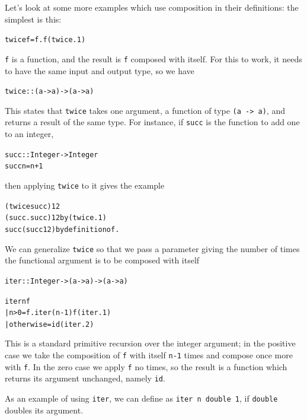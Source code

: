 Let's look at some more examples which use composition in their definitions: the 
simplest is this: 
\begin{alltt}
twice f = f.f\hfill (twice.1)
\end{alltt}
\texttt{f} is a function, and the result is \texttt{f} composed with itself. For
this to work, it needs to have the same input and output type, so we have
\begin{alltt}
twice :: (a -> a) -> (a -> a)
\end{alltt}
This states that \texttt{twice} takes one argument, a function of type 
\texttt{(a -> a)}, and returns a result of the same type. For instance, if \texttt{succ}
is the function to add one to an integer, 
\begin{alltt}
succ :: Integer -> Integer
succ n = n+1
\end{alltt}
then applying \texttt{twice} to it gives the example
\begin{alltt}
(twice succ) 12
\step (succ.succ) 12 \hfill {\rm by} (twice.1)
\step succ (succ 12) \hfill {\rm by definition of } .
\end{alltt}
We can generalize \texttt{twice} so that we pass a parameter giving the number
of times the functional argument is to be composed with itself
\begin{alltt}
iter :: Integer -> (a -> a) -> (a -> a)

iter n f 
  | n>0         = f . iter (n-1) f\hfill(iter.1)
  | otherwise   = id\hfill(iter.2)
\end{alltt}
This is a standard primitive recursion over the integer argument; in the
positive case we take the composition of \texttt{f} with itself
\texttt{n-1} times and compose once more with \texttt{f}. In the zero case
we apply \texttt{f} no times, so the result is a function which returns its argument unchanged, namely \texttt{id}. 

As an example of using \texttt{iter}, we can define \texttt{} as \texttt{iter n double
1}, if \texttt{double} doubles its argument. 


